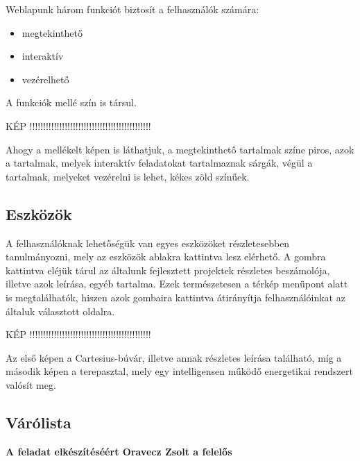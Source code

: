 \documentclass[
]{thesis-ekf}
\theoremstyle{definition}
\theoremstyle{remark}
\begin{document}
			 Weblapunk három funkciót biztosít a felhasználók számára:
			\begin{itemize}
				\item megtekinthető
				\item interaktív
				\item vezérelhető
			\end{itemize}
			\par A funkciók mellé szín is társul.
			\par KÉP !!!!!!!!!!!!!!!!!!!!!!!!!!!!!!!!!!!!!!!!!!!!!
			\par Ahogy a mellékelt képen is láthatjuk, a megtekinthető tartalmak színe piros, azok a tartalmak, melyek interaktív feladatokat tartalmaznak sárgák, végül a tartalmak, melyeket vezérelni is lehet, kékes zöld színűek.
			
		\subsection{Eszközök}
			\par A felhasználóknak lehetőségük van egyes eszközöket részletesebben tanulmányozni, mely az eszközök ablakra kattintva lesz elérhető. A gombra kattintva eléjük tárul az általunk fejlesztett projektek részletes beszámolója, illetve azok leírása, egyéb tartalma. Ezek természetesen a térkép menüpont alatt is megtalálhatók, hiszen azok gombaira kattintva átirányítja felhasználóinkat az általuk választott oldalra.
			\par KÉP !!!!!!!!!!!!!!!!!!!!!!!!!!!!!!!!!!!!!!!!!!!!!
			\par Az első képen a Cartesius-búvár, illetve annak részletes leírása található, míg a második képen a terepasztal, mely egy intelligensen működő energetikai rendszert valósít meg.
		\subsection{Várólista}
		\textbf{A feladat elkészítéséért Oravecz Zsolt a felelős}
		
\end{document}
